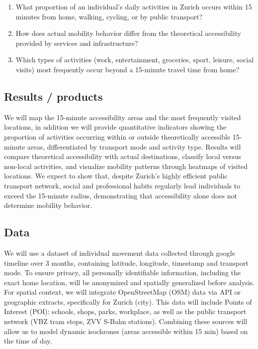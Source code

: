 \documentclass[
  letterpaper,
  DIV=11,
  numbers=noendperiod]{scrartcl}
\providecommand{\tightlist}{%
  \setlength{\itemsep}{0pt}\setlength{\parskip}{0pt}}
\begin{document}
\begin{enumerate}
\def\labelenumi{\arabic{enumi}.}
\tightlist
\item
  What proportion of an individual's daily activities in Zurich occurs
  within 15 minutes from home, walking, cycling, or by public transport?
\item
  How does actual mobility behavior differ from the theoretical
  accessibility provided by services and infrastructure?
\item
  Which types of activities (work, entertainment, groceries, sport,
  leisure, social visits) most frequently occur beyond a 15‑minute
  travel time from home?
\end{enumerate}

\subsection{Results / products}\label{results-products}

We will map the 15-minute accessibility areas and the most frequently
visited locations, in addition we will provide quantitative indicators
showing the proportion of activities occurring within or outside
theoretically accessible 15-minute areas, differentiated by transport
mode and activity type. Results will compare theoretical accessibility
with actual destinations, classify local versus non-local activities,
and visualize mobility patterns through heatmaps of visited locations.
We expect to show that, despite Zurich's highly efficient public
transport network, social and professional habits regularly lead
individuals to exceed the 15-minute radius, demonstrating that
accessibility alone does not determine mobility behavior.

\subsection{Data}\label{data}

We will use a dataset of individual movement data collected through
google timeline over 3 months, containing latitude, longitude, timestamp
and transport mode. To ensure privacy, all personally identifiable
information, including the exact home location, will be anonymized and
spatially generalized before analysis. For spatial context, we will
integrate OpenStreetMap (OSM) data via API or geographic extracts,
specifically for Zurich (city). This data will include Points of
Interest (POI): schools, shops, parks, workplace, as well as the public
transport network (VBZ tram stops, ZVV S-Bahn stations). Combining these
sources will allow us to model dynamic isochrones (areas accessible
within 15 min) based on the time of day.
\end{document}
